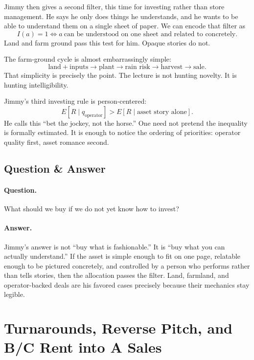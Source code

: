 Jimmy then gives a second filter, this time for investing rather than store management. He says he only does things he understands, and he wants to be able to understand them on a single sheet of paper. We can encode that filter as
\begin{equation}
I(a)=1 \iff a\ \text{can be understood on one sheet and related to concretely}.
\end{equation}
Land and farm ground pass this test for him. Opaque stories do not.

The farm-ground cycle is almost embarrassingly simple:
\begin{equation}
\text{land}+\text{inputs}\rightarrow \text{plant}\rightarrow \text{rain risk}\rightarrow \text{harvest}\rightarrow \text{sale}.
\end{equation}
That simplicity is precisely the point. The lecture is not hunting novelty. It is hunting intelligibility.

Jimmy's third investing rule is person-centered:
\begin{equation}
E[R\mid q_{\mathrm{operator}}] > E[R\mid \text{asset story alone}].
\end{equation}
He calls this ``bet the jockey, not the horse.'' One need not pretend the inequality is formally estimated. It is enough to notice the ordering of priorities: operator quality first, asset romance second.

\subsection{Question \& Answer}

\paragraph{Question.} What should we buy if we do not yet know how to invest?

\paragraph{Answer.} Jimmy's answer is not ``buy what is fashionable.'' It is ``buy what you can actually understand.'' If the asset is simple enough to fit on one page, relatable enough to be pictured concretely, and controlled by a person who performs rather than tells stories, then the allocation passes the filter. Land, farmland, and operator-backed deals are his favored cases precisely because their mechanics stay legible.

\section{Turnarounds, Reverse Pitch, and B/C Rent into A Sales}

